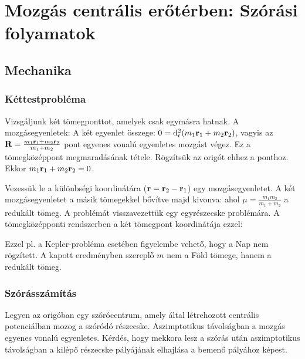 \chapter{Mozg\'as centr\'alis er\H{o}t\'erben: Sz\'or\'asi folyamatok}
 
 \section{Mechanika} 
  
  \subsection{Kéttestprobléma} 
   
   Vizsgáljunk két tömegponttot, amelyek csak egymásra hatnak. A mozgásegyenletek:
   A két egyenlet összege: $0=\mathrm{d}_t^2(m_1\mathbf{r}_1+m_2\mathbf{r}_2)$, vagyis az $\mathbf{R}=\frac{m_1\mathbf{r}_1+m_2\mathbf{r}_2}{m_1+m_2}$ pont egyenes vonalú egyenletes mozgást végez. Ez a tömegközéppont megmaradásának tétele. Rögzítsük az origót ehhez a ponthoz. Ekkor $m_1\mathbf{r}_1+m_2\mathbf{r}_2=0$.
   
   Vezessük le a különbségi koordinátára ($\mathbf{r}=\mathbf{r}_2-\mathbf{r}_1$) egy mozgásegyenletet. A két mozgásegyenletet a másik tömegekkel bővítve majd kivonva:
   ahol $\mu=\frac{m_1 m_2}{m_1+m_2}$ a redukált tömeg. A problémát visszavezettük egy egyrészecske problémára. A tömegközépponti rendszerben a két tömegpont koordinátája ezzel:
   
   Ezzel pl. a Kepler-probléma esetében figyelembe vehető, hogy a Nap nem rögzített. A kapott eredményben szereplő $m$ nem a Föld tömege, hanem a redukált tömeg. 
   
  \subsection{Szórásszámítás}
   
   Legyen az origóban egy szórócentrum, amely által létrehozott centrális potenciálban mozog a szóródó részecske. Aszimptotikus távolságban a mozgás egyenes vonalú egyenletes. Kérdés, hogy mekkora lesz a szórás után aszimptotikus távolságban a kilépő részecske pályájának elhajlása a bemenő pályához képest. 
   
